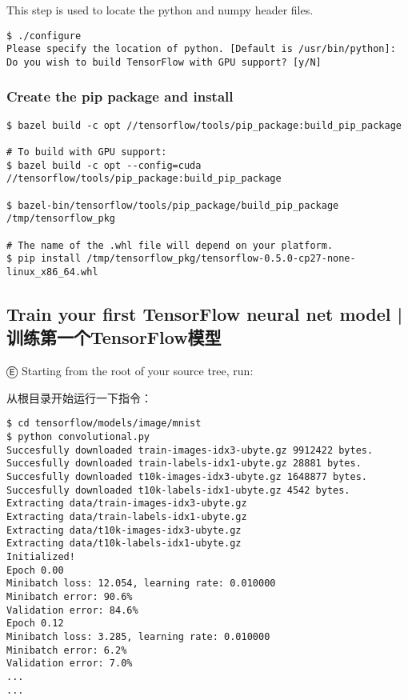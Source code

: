 This step is used to locate the python and numpy header files.

\begin{lstlisting}
$ ./configure
Please specify the location of python. [Default is /usr/bin/python]:
Do you wish to build TensorFlow with GPU support? [y/N]
\end{lstlisting}

\subsubsection {Create the pip package and install}

\begin{lstlisting}
$ bazel build -c opt //tensorflow/tools/pip_package:build_pip_package

# To build with GPU support:
$ bazel build -c opt --config=cuda //tensorflow/tools/pip_package:build_pip_package

$ bazel-bin/tensorflow/tools/pip_package/build_pip_package /tmp/tensorflow_pkg

# The name of the .whl file will depend on your platform.
$ pip install /tmp/tensorflow_pkg/tensorflow-0.5.0-cp27-none-linux_x86_64.whl
\end{lstlisting}

%
\subsection {Train your first TensorFlow neural net model  |  训练第一个TensorFlow模型}

Ⓔ \textcolor{etc}{Starting from the root of your source tree, run:}

从根目录开始运行一下指令：

\begin{lstlisting}
$ cd tensorflow/models/image/mnist
$ python convolutional.py
Succesfully downloaded train-images-idx3-ubyte.gz 9912422 bytes.
Succesfully downloaded train-labels-idx1-ubyte.gz 28881 bytes.
Succesfully downloaded t10k-images-idx3-ubyte.gz 1648877 bytes.
Succesfully downloaded t10k-labels-idx1-ubyte.gz 4542 bytes.
Extracting data/train-images-idx3-ubyte.gz
Extracting data/train-labels-idx1-ubyte.gz
Extracting data/t10k-images-idx3-ubyte.gz
Extracting data/t10k-labels-idx1-ubyte.gz
Initialized!
Epoch 0.00
Minibatch loss: 12.054, learning rate: 0.010000
Minibatch error: 90.6%
Validation error: 84.6%
Epoch 0.12
Minibatch loss: 3.285, learning rate: 0.010000
Minibatch error: 6.2%
Validation error: 7.0%
...
...
\end{lstlisting}


